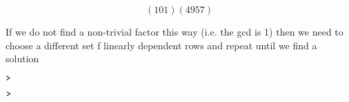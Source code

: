 \documentclass{article}
\begin{document}
\begin{dmath}\label{(14)}
\left(101\right) \left(4957\right)
\end{dmath}
\begin{Maple Normal}
If we do not find a non-trivial factor this way (i.e. the gcd is 1) then we need to choose a different set f linearly dependent rows and repeat until we find a solution
\end{Maple Normal}
\mapleinput
{$ \displaystyle \texttt{>\,}  $}

\begin{Maple Normal}

\end{Maple Normal}
\begin{Maple Normal}

\end{Maple Normal}
\begin{Maple Normal}

\end{Maple Normal}
\mapleinput
{$ \displaystyle \texttt{>\,} \, $}
\end{document}
